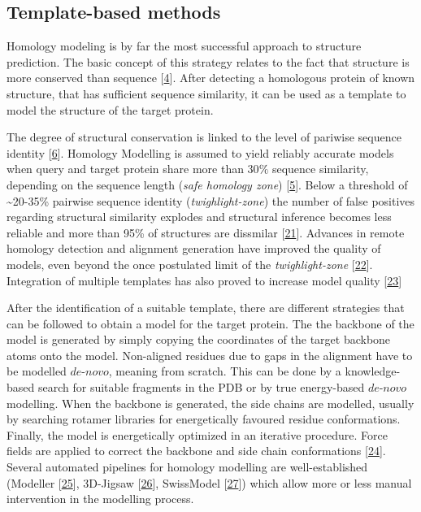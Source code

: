 \documentclass[12pt,a4paper,twoside]{book}
\theoremstyle{definition}
\theoremstyle{definition}
\theoremstyle{remark}
\begin{document}
\subsection{Template-based methods}\label{template-based-methods}

Homology modeling is by far the most successful approach to structure
prediction. The basic concept of this strategy relates to the fact that
structure is more conserved than sequence
{[}\protect\hyperlink{ref-Lesk1980}{4}{]}. After detecting a homologous
protein of known structure, that has sufficient sequence similarity, it
can be used as a template to model the structure of the target protein.

The degree of structural conservation is linked to the level of pariwise
sequence identity {[}\protect\hyperlink{ref-Chothia1986}{6}{]}. Homology
Modelling is assumed to yield reliably accurate models when query and
target protein share more than 30\(\%\) sequence similarity, depending
on the sequence length (\emph{safe homology zone})
{[}\protect\hyperlink{ref-Sander1991}{5}{]}. Below a threshold of
\textasciitilde{}20-35\% pairwise sequence identity
(\emph{twighlight-zone}) the number of false positives regarding
structural similarity explodes and structural inference becomes less
reliable and more than 95\% of structures are dissmilar
{[}\protect\hyperlink{ref-Rost1999}{21}{]}. Advances in remote homology
detection and alignment generation have improved the quality of models,
even beyond the once postulated limit of the \emph{twighlight-zone}
{[}\protect\hyperlink{ref-Yan2013}{22}{]}. Integration of multiple
templates has also proved to increase model quality
{[}\protect\hyperlink{ref-Meier2015}{23}{]}

After the identification of a suitable template, there are different
strategies that can be followed to obtain a model for the target
protein. The the backbone of the model is generated by simply copying
the coordinates of the target backbone atoms onto the model. Non-aligned
residues due to gaps in the alignment have to be modelled
\(\textit{de-novo}\), meaning from scratch. This can be done by a
knowledge-based search for suitable fragments in the PDB or by true
energy-based \(\textit{de-novo}\) modelling. When the backbone is
generated, the side chains are modelled, usually by searching rotamer
libraries for energetically favoured residue conformations. Finally, the
model is energetically optimized in an iterative procedure. Force fields
are applied to correct the backbone and side chain conformations
{[}\protect\hyperlink{ref-Gu2009}{24}{]}. Several automated pipelines
for homology modelling are well-established (Modeller
{[}\protect\hyperlink{ref-Eswar2007}{25}{]}, 3D-Jigsaw
{[}\protect\hyperlink{ref-Bates2001}{26}{]}, SwissModel
{[}\protect\hyperlink{ref-Arnold2006}{27}{]}) which allow more or less
manual intervention in the modelling process.
\end{document}
